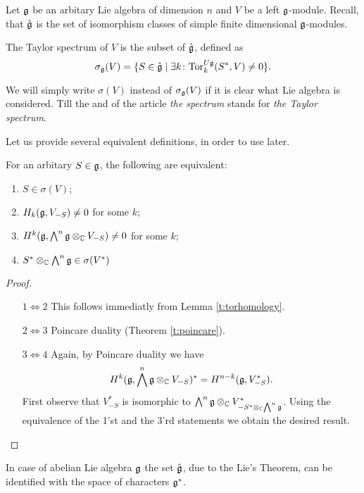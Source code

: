 Let $\mathfrak{g}$ be an arbitary Lie algebra of dimension $n$ and $V$ be a left $\mathfrak{g}$-module.  Recall, that $\hat{\mathfrak{g}}$
is the set of isomorphism classes of simple finite dimensional $\mathfrak{g}$-modules.
\begin{definition}
    The Taylor spectrum of $V$ is the subset of $\hat{\mathfrak{g}}$, defined as
    \[
        \sigma_{\mathfrak{g}}(V)=\{ S\in \hat{\mathfrak{g}} \mid \exists 
            k \colon \mathrm{Tor}^{U\mathfrak{g}}_k(S^*,V)\neq 0\}.
    \]
\end{definition}
We will simply write $\sigma(V)$ instead of $\sigma_{\mathfrak{g}}(V)$ if it is clear what Lie algebra is
considered. Till the and of the article \emph{the spectrum} stands for \emph{the Taylor spectrum}.

Let us provide several equivalent definitions, in order to use later.
\begin{lemma} \label{l:definitions}
   For an arbitary $S\in\mathfrak{g}$, the following are equivalent:
   \begin{enumerate}
       \item $S \in \sigma(V)$; 
           
       \item $H_k(\mathfrak{g}, V_{-S}) \ne 0$ for some $k$; 

       \item $H^k(\mathfrak{g}, \bigwedge^n\mathfrak{g}\otimes_{\mathbb{C}} V_{-S}) \ne 0$ for some $k$;

       \item $S^* \otimes_{\mathbb{C}} \bigwedge^n\mathfrak{g} \in \sigma(V^*)$
   \end{enumerate}
\end{lemma}
\begin{proof}
    \begin{itemize}
        \item[$1 \Leftrightarrow 2$]
            This follows immediatly from Lemma \ref{t:torhomology}.

        \item[$2 \Leftrightarrow 3$]
            Poincare duality (Theorem \ref{t:poincare}).

        \item[$3 \Leftrightarrow 4$]
            Again, by Poincare duality we have
            \[
                H^k(\mathfrak{g}, \bigwedge^n\mathfrak{g} \otimes_{\mathbb{C}} V_{-S})^* = H^{n - k} (\mathfrak{g}, V_{-S}^*).
            \]
            First observe that $V^*_{-S}$ is isomorphic to $\bigwedge^n\mathfrak{g} \otimes_{\mathbb{C}}
            V^*_{-S^* \otimes_{\mathbb{C}} \bigwedge^n\mathfrak{g}}$. Using the equivalence of the 1'st and the
            3'rd statements we obtain the desired result. 
    \end{itemize}
\end{proof}
    In case of abelian Lie algebra $\mathfrak{g}$ the set $\hat{\mathfrak{g}}$, due to the Lie's Theorem, can be
    identified with the space of characters $\mathfrak{g}^*$. 
